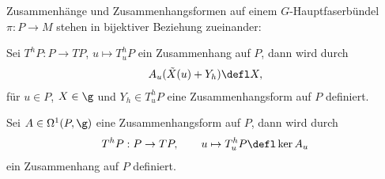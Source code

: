 \documentclass[%
	paper=a5,%
	fleqn,%
	DIV=18,%
	BCOR=0mm,
	fontsize=11pt,
	titlepage=false,%
	bibliography=totoc,
	DIV=18,%
	twoside=true,
	pdftitle=Riemannsche Geometrie,
	pdfauthor=Uwe Semmelmann,
	numbers=noendperiod]%
	{scrbook}
\begin{document}
\begin{prop}
\label{prop:Zusammenhang-Zusammenhangsform-1:1}
Zusammenhänge und Zusammenhangsformen auf einem $G$-Hauptfaserbündel
$\pi\colon P\to M$ stehen in bijektiver Beziehung zueinander:
\begin{propenum}
\item Sei $T^hP\colon P\to TP$, $u\mapsto T^h_uP$ ein Zusammenhang auf $P$, dann
wird durch
\begin{align*}
A_u(\tilde{X}(u)+Y_h) \defl X,
\end{align*}
für $u\in P$, $X\in \g$ und $Y_h \in T^h_uP$ eine Zusammenhangsform auf $P$
definiert.
\item Sei $A\in \Omega^1(P,\g)$ eine Zusammenhangsform auf $P$, dann wird durch
\begin{align*}
T^hP: P\to TP,\qquad u\mapsto T^h_uP \defl \ker A_u
\end{align*}
ein Zusammenhang auf $P$ definiert.\fish
\end{propenum}
\end{prop}
\end{document}
